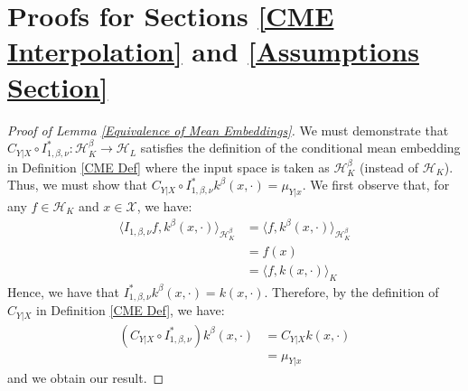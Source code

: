 \documentclass[accepted]{article}
\theoremstyle{definition}
\begin{document}

\clearpage
\appendix

\thispagestyle{empty}


\onecolumn \makesupplementtitle
\section{Proofs for Sections \ref{CME Interpolation} and \ref{Assumptions Section}}
\label{Assumptions Proofs}
\begin{proof}[Proof of Lemma \ref{Equivalence of Mean Embeddings}]
We must demonstrate that $C_{Y|X} \circ I^{*}_{1, \beta, \nu}: \mathcal{H}^{\beta}_K \to \mathcal{H}_L$ satisfies the definition of the conditional mean embedding in Definition \ref{CME Def} where the input space is taken as $\mathcal{H}_{K}^{\beta}$ (instead of $\mathcal{H}_K$). Thus, we must show that $C_{Y|X} \circ I^{*}_{1, \beta, \nu} k^{\beta}(x, \cdot) = \mu_{Y|x}$. We first observe that, for any $f \in \mathcal{H}_{K}$ and $x \in \mathcal{X}$, we have:
\begin{align*}
    \langle I_{1, \beta, \nu}f, k^{\beta}(x, \cdot) \rangle_{\mathcal{H}^{\beta}_{K}} & = \langle f, k^{\beta}(x, \cdot) \rangle_{\mathcal{H}^{\beta}_{K}}  \\
    & = f(x) \\
    & = \langle f, k(x, \cdot) \rangle_{K} 
\end{align*}
Hence, we have that $I^{*}_{1, \beta, \nu}k^{\beta}(x, \cdot) = k(x, \cdot)$. Therefore, by the definition of $C_{Y|X}$ in Definition \ref{CME Def}, we have:
\begin{align*}
   (C_{Y|X} \circ I^{*}_{1, \beta, \nu}) k^{\beta}(x, \cdot) &= C_{Y|X} k(x, \cdot) \\
   & = \mu_{Y|x}
\end{align*}
and we obtain our result. 
\end{proof}
\end{document}
